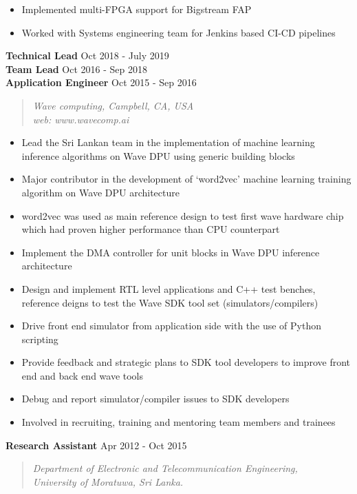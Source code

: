 \documentclass[mm]{./assets/res} %
\begin{document}
\begin{resume}
\begin{itemize}
	\item Implemented multi-FPGA support for Bigstream FAP
	\item Worked with Systems engineering team for Jenkins based CI-CD pipelines
\end{itemize}
\textbf{Technical Lead} \hfill Oct 2018 - July 2019\\
\textbf{Team Lead} \hfill Oct 2016 - Sep 2018\\
\textbf{Application Engineer} \hfill Oct 2015 - Sep 2016
\begin{quote}
	\emph{Wave computing, Campbell, CA, USA\\
		  web: www.wavecomp.ai}
\end{quote}
\begin{itemize} \itemsep -1pt 
	\item Lead the Sri Lankan team in the implementation of machine learning inference algorithms on Wave DPU using generic building blocks
	\item Major contributor in the development of `word2vec' machine learning training algorithm on Wave DPU architecture
	\item word2vec was used as main reference design to test first wave hardware chip which had proven higher performance than CPU counterpart
	\item Implement the DMA controller for unit blocks in Wave DPU inference architecture
	\item Design and implement RTL level applications and C++ test benches, reference deigns to test the Wave SDK tool set (simulators/compilers)
	\item Drive front end simulator from application side with the use of Python scripting
	\item Provide feedback and strategic plans to SDK tool developers to improve front end and back end wave tools
	\item Debug and report simulator/compiler issues to SDK developers
	\item Involved in recruiting, training and mentoring team members and trainees
\end{itemize}

\textbf{Research Assistant} \hfill Apr 2012 - Oct 2015
\begin{quote}
	\emph{Department of Electronic and Telecommunication Engineering, \\
		University of Moratuwa, Sri Lanka.}
\end{quote}


\end{resume}
\end{document}
